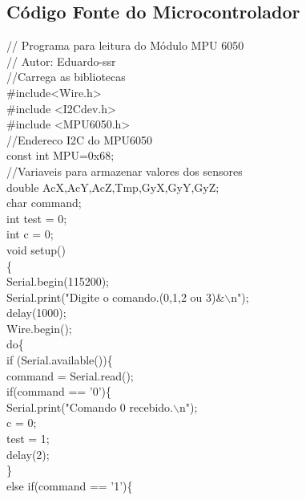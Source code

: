 \begin{anexosenv}

\partanexos

\chapter{Código Fonte do Microcontrolador}


// Programa para leitura do Módulo MPU 6050 \\
// Autor: Eduardo-ssr\\

//Carrega as bibliotecas\\
\#include<Wire.h>\\
\#include <I2Cdev.h>\\
\#include <MPU6050.h>\\

//Endereco I2C do MPU6050\\
const int MPU=0x68;  \\

//Variaveis para armazenar valores dos sensores\\
double AcX,AcY,AcZ,Tmp,GyX,GyY,GyZ;\\
char command;\\
int test = 0;\\
int c = 0;\\

void setup()\\
\{\\
	Serial.begin(115200);\\
	Serial.print("Digite o comando.(0,1,2 ou 3)\&$\backslash$n");\\
	delay(1000);\\
	Wire.begin();\\
	do\{\\
		if (Serial.available())\{\\
			
			command = Serial.read();\\
			
			if(command == '0')\{\\  
				Serial.print("Comando 0 recebido.$\backslash$n");\\
				c = 0;\\
				test = 1;\\
				delay(2);\\	
			\}\\	
			else if(command == '1')\{\\
			

\end{anexosenv}
